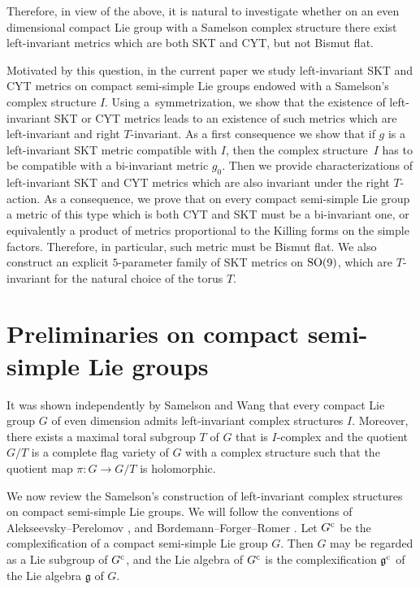 \documentclass[pdftex]{sigma}
\numberwithin{equation}{section}
\begin{document}
Therefore, in view of the above, it is natural to investigate whether on an even dimensional compact Lie group with a Samelson complex structure there exist left-invariant metrics which are both SKT and CYT, but not Bismut flat.

Motivated by this question, in the current paper we study left-invariant SKT and CYT metrics on compact semi-simple Lie groups endowed with a Samelson's complex structure $I$. Using a~symmetrization, we show that the existence of left-invariant SKT or CYT metrics leads to an existence of such metrics which are left-invariant and right $T$-invariant. As a first consequence we show that if $g$ is a left-invariant SKT metric compatible with $I$, then the complex structure~$I$ has to be compatible with a bi-invariant metric $g_0$. Then we provide characterizations of left-invariant SKT and CYT metrics which are also invariant under the right $T$-action. As a consequence, we prove that on every compact semi-simple Lie group a metric of this type which is both CYT and SKT must be a bi-invariant one, or equivalently a product of metrics proportional to the Killing forms on the simple factors. Therefore, in particular, such metric must be Bismut flat. We also construct an explicit $5$-parameter family of SKT metrics on ${\rm SO}(9)$, which are $T$-invariant for the natural choice of the torus $T$.

\section{Preliminaries on compact semi-simple Lie groups}
It was shown independently by Samelson \cite{Samelson} and Wang \cite{Wang} that every compact Lie group $G$ of even dimension admits left-invariant complex structures $I$.
Moreover, there exists a maximal toral subgroup $T$ of $G$ that is $I$-complex and the quotient $G/T$
is a complete flag variety of $G$ with a complex structure such that the quotient map $\pi\colon G \rightarrow G/T$ is holomorphic.

We now review the Samelson's construction of left-invariant complex structures on compact semi-simple Lie groups.
We will follow the conventions of Alekseevsky--Perelomov \cite{AlP}, and Bordemann--Forger--Romer \cite{BFR}.
 Let $G^{\rm c}$ be the complexification of a compact semi-simple Lie group $G$. Then $G$ may be regarded as a Lie subgroup of $G^{\rm c}$, and the Lie algebra of $G^{\rm c}$ is the complexification $\mathfrak g^{\rm c}$ of the Lie algebra $\mathfrak g$ of $G$.
\end{document}
